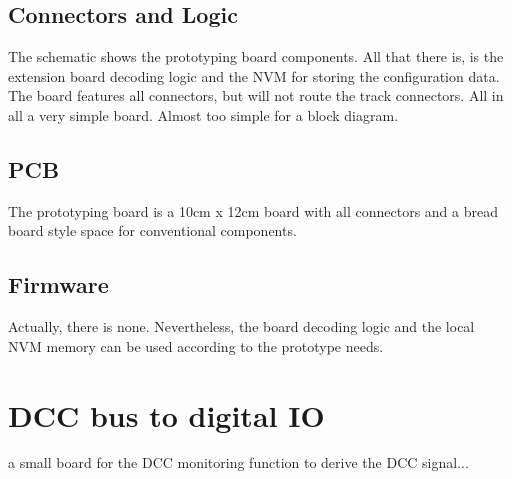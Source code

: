 \subsection{Connectors and Logic}

The schematic shows the prototyping board components. All that there is, is the extension board decoding logic and the NVM for storing the configuration data. The board features all connectors, but will not route the track connectors. All in all a very simple board. Almost too simple for a block diagram.


\subsection{PCB}

The prototyping board is a 10cm x 12cm board with all connectors and a bread board style space for conventional components.


\subsection{Firmware}

Actually, there is none. Nevertheless, the board decoding logic and the local NVM memory can be used according to the prototype needs.



\section{DCC bus to digital IO}

a small board for the DCC monitoring function to derive the DCC signal...

